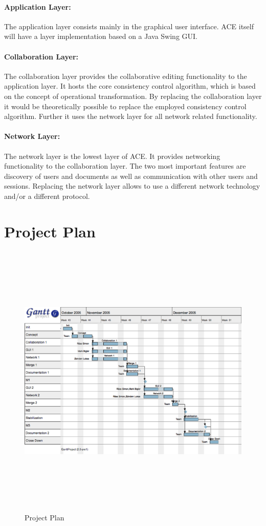 \documentclass[11pt,a4paper]{article}
\begin{document}
\paragraph{Application Layer:} The application layer consists mainly in the graphical
user interface. ACE itself will have a layer implementation based on a Java Swing GUI.

\paragraph{Collaboration Layer:} The collaboration layer provides the collaborative
editing functionality to the application layer. It hosts the core consistency
control algorithm, which is based on the concept of operational transformation.
By replacing the collaboration layer it would be theoretically possible to replace
the employed consistency control algorithm. Further it uses the network layer
for all network related functionality.

\paragraph{Network Layer:} The network layer is the lowest layer of ACE. It provides
networking functionality to the collaboration layer. The two most important features
are discovery of users and documents as well as communication with other users and
sessions. Replacing the network layer allows to use a different network technology 
and/or a different protocol.


\section{Project Plan}

\begin{figure}[H]
 \centering
 \includegraphics[height=379pt,width=585pt,angle=90]{../images/projectmanagement/gantt.eps}
 \caption{Project Plan}
\end{figure}
\newpage
\end{document}
